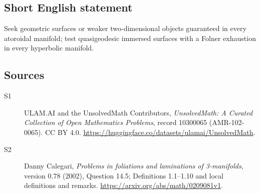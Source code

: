 \documentclass[11pt]{article}
\begin{document}
\subsection{Short English statement}
Seek geometric surfaces or weaker two-dimensional objects guaranteed in every atoroidal manifold; test quasigeodesic immersed surfaces with a Folner exhaustion in every hyperbolic manifold.
\subsection{Sources}
\begin{description}
\item[\hypertarget{source:10300065:1}{S1}] ULAM.AI and the UnsolvedMath Contributors, \emph{UnsolvedMath: A Curated Collection of Open Mathematics Problems}, record 10300065 (AMR-102-0065). CC BY 4.0. \url{https://huggingface.co/datasets/ulamai/UnsolvedMath}.
\item[\hypertarget{source:10300065:2}{S2}] Danny Calegari, \emph{Problems in foliations and laminations of 3-manifolds}, version 0.78 (2002), Question 14.5; Definitions 1.1--1.10 and local definitions and remarks. \url{https://arxiv.org/abs/math/0209081v1}.
\end{description}
\label{end:10300065}
\end{document}
